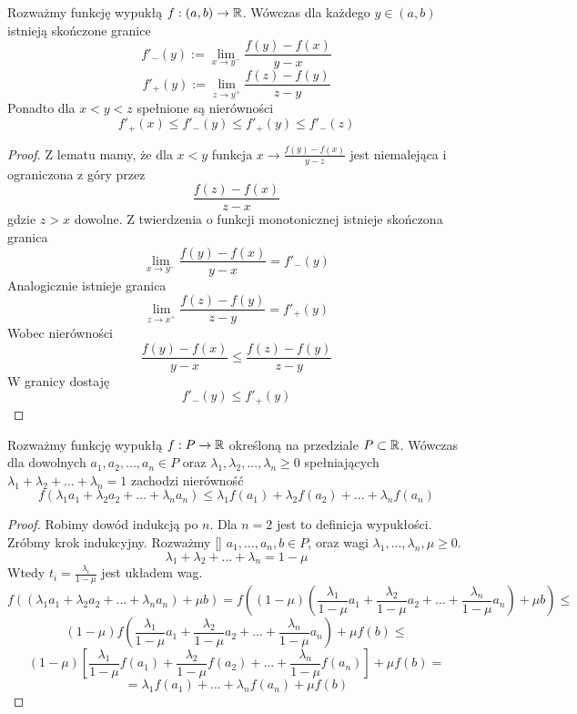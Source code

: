 \documentclass[9pt]{article}
\begin{document}
\begin{Twi}
    Rozważmy funkcję wypukłą $f: (a,b) \to \mathbb{R}$. Wówczas dla każdego $y \in (a,b)$ istnieją skończone
    granice
    \[
        f'_- (y) := \lim_{x \to y^-} \frac{f(y)-f(x)}{y-x}
    \]
    \[
        f'_+ (y) := \lim_{z \to y^+} \frac{f(z)-f(y)}{z-y}
    \]
    Ponadto dla $x < y < z$ spełnione są nierówności
    \[
        f'_+(x) \le f'_-(y) \le f'_+ (y) \le f'_- (z)
    \]
\end{Twi}

\begin{proof}
    Z lematu mamy, że dla $x < y$ funkcja
    $x \to \frac{f(y)-f(x)}{y-z}$ jest niemalejąca i ograniczona z góry przez
    \[
        \frac{f(z) - f(x)}{z-x}
    \]
    gdzie $z > x$ dowolne. Z twierdzenia o funkcji monotonicznej istnieje skończona granica
    \[
        \lim_{x \to y^-} \frac{f(y)-f(x)}{y-x} = f'_- (y)
    \]
    Analogicznie istnieje granica
    \[
        \lim_{z \to x^+} \frac{f(z)-f(y)}{z-y} = f'_+ (y)
    \]
    Wobec nierówności
    \[
        \frac{f(y)-f(x)}{y-x} \le \frac{f(z)-f(y)}{z-y}
    \]
    W granicy dostaję
    \[
        f'_- (y) \le f'_+ (y)
    \]
\end{proof}

\begin{Twi}
    Rozważmy funkcję wypukłą $f: P \to \mathbb{R}$ określoną na przedziale $P \subset \mathbb{R}$. Wówczas dla
    dowolnych $a_1, a_2, ..., a_n \in P$ oraz $\lambda_1, \lambda_2, ..., \lambda_n \ge 0$
    spełniających $\lambda_1 + \lambda_2 + ... + \lambda_n = 1$ zachodzi nierówność
    \[
        f (\lambda_1 a_1 + \lambda_2 a_2 + ... + \lambda_n a_n) \le
        \lambda_1 f(a_1) + \lambda_2 f(a_2) + ... + \lambda_n f(a_n)
    \]
\end{Twi}

\begin{proof}
    Robimy dowód indukcją po $n$. Dla $n = 2$ jest to definicja wypukłości. Zróbmy krok indukcyjny.
    Rozważmy [] $a_1, ..., a_n, b \in P$, oraz wagi $\lambda_1, ..., \lambda_n, \mu \ge 0$.
    \[
        \lambda_1 + \lambda_2 + ... + \lambda_n = 1-\mu
    \]
    Wtedy $t_i = \frac{\lambda_i}{1-\mu}$ jest układem wag.
    \[
        f ((\lambda_1 a_1 + \lambda_2 a_2 + ... + \lambda_n a_n) + \mu b) =
        f \left(
            (1-\mu) \left(
                \frac{\lambda_1}{1-\mu} a_1 +
                \frac{\lambda_2}{1-\mu} a_2 + ... +
                \frac{\lambda_n}{1-\mu} a_n
            \right) + \mu b
        \right)
        \le
    \]
    \[
        (1-\mu)
        f \left(  
            \frac{\lambda_1}{1-\mu} a_1 +
            \frac{\lambda_2}{1-\mu} a_2 + ... +
            \frac{\lambda_n}{1-\mu} a_n
        \right)
        + \mu f\left(b\right)
        \le
    \]
    \[
        (1-\mu)
        \left[
            \frac{\lambda_1}{1-\mu} f(a_1) +
            \frac{\lambda_2}{1-\mu} f(a_2) + ... + 
            \frac{\lambda_n}{1-\mu} f(a_n)
        \right]
        + \mu f\left(b\right)
        =
    \]
    \[
        =
        \lambda_1 f(a_1) + ... + \lambda_n f(a_n) + \mu f(b)
    \]
\end{proof}
\end{document}
